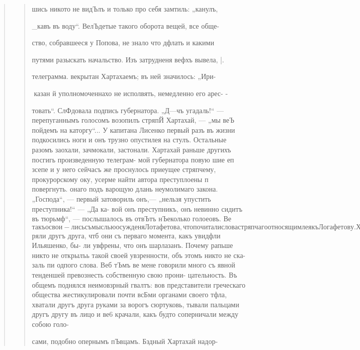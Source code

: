 \begin{quote}
\begin{quote}
шись никото не видЪлъ и только про себя замтиль: „канулъ,

_кавъ въ воду“. ВелЪдетые такого оборота вещей, все обще-

ство, собравшееся у Попова, не знало что дфлать и какими

путями разыскать начальство. Изъ затрудненя вефхъ вывела,
|.

телеграмма. векрытан Хартахаемъ; въ ней значилось: „Ири-

казан й уполномоченнахо не исполвять, немедленно его арес- -

товать“. СлФдовала подпись губернатора. „Д—чъ угадаль!“ —
перепуганнымъ голосомъ возопилъ стряпЙ Хартахай, — „мы
веЪ пойдемъ на каторгу“... У капитана Лисенко первый
разъ въ жизни подкосились ноги и онъ трузно опустилея
на стулъ. Остальные разомъ заохали, зачмокали, застонали.
Хартахай раньше другихъ посгигь произведенную телеграм-
мой губернатора повую шие еп зсепе и у него сейчасъ
же проснулось приеущее стряпчему, прокурорскому оку,
усерме найти автора преступлоены п повергнуть. онаго подъ
варощую длань неумолимаго закона. „Господа“, — первый
затовориль онъ,— „нельзя упустить преступника!“ — „Да ка-
вой онъ преступникъ, онъ невинно сидитъ въ тюрьмф“, —
послышалось въ отвЪтъ нЪеколько голоеовъ. Ве$ такъ освои-
лись съ мыслью осужденя Лотафетова, что почитали слова
стряпчаго относящимлея къ Логафетову. Хартахай взбфсился
оть этой неповоротливости сообразительности и на кончик»
языка виефлъ у него отьфть: „барашы“! Но лица, къ коимъ
должно было приложиться @1е пазваве, уже попали свое
Ча рго Чао, и стали совмфетно и громко говорить что-то
въ свое оправдане, причемъ веЪ усердно ув$ряли другъ друга,
чтб они съ перваго момента, какъ увидфли Ильяшенко, бы-
ли увфрены, что онъ шарлазанъ. Почему рапьше никто не
открылъь такой своей увзренности, объ этомъ никто не ска-
заль пи одпого слова. Веб тЪмъ ве мене говорили много
съ явной тенденшей превознесть собственную свою прони-
цательность. Въ общемъ поднялся неимовзрный гвалтъ: вов
представители греческаго общества жестикулировали почти
всБми органами своего тфла, хватали другъ друга руками
за ворогъ сюртуковь, тывали пальцами другъ другу въ лицо
и ве6 крачали, какъ будто соперничали между собою голо-

сами, подобно опернымъ пЪвцамъ. Бздный Хартахай надор-


\end{quote}
\end{quote}

